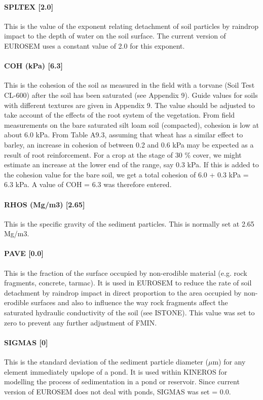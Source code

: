 \paragraph{SPLTEX [2.0]}
This is the value of the exponent relating detachment of soil particles by raindrop impact to the depth of water on the soil surface. The current version of EUROSEM uses a constant value of 2.0 for this exponent.
 
\paragraph{COH (kPa) [6.3]}
This is the cohesion of the soil as measured in the field with a torvane (Soil Test CL-600) after the soil has been saturated (see Appendix 9). Guide values for soils with different textures are given in Appendix 9. The value should be adjusted to take account of the effects of the root system of the vegetation.
From field measurements on the bare saturated silt loam soil (compacted), cohesion is low at about 6.0 kPa. From Table A9.3, assuming that wheat has a similar effect to barley, an increase in cohesion of between 0.2 and 0.6 kPa may be expected as a result of root reinforcement. For a crop at the stage of 30 \% cover, we might estimate an increase at the lower end of the range, say 0.3 kPa. If this is added to the cohesion value for the bare soil, we get a total cohesion of 6.0 + 0.3 kPa = 6.3 kPa. A value of COH = 6.3 was therefore entered.
 
\paragraph{RHOS (Mg/m3) [2.65]}
This is the specific gravity of the sediment particles. This is normally set at 2.65 Mg/m3.
 
\paragraph{PAVE [0.0]}
This is the fraction of the surface occupied by non-erodible material (e.g. rock fragments, concrete, tarmac). It is used in EUROSEM to reduce the rate of soil detachment by raindrop impact in direct proportion to the area occupied by non-erodible surfaces and also to influence the way rock fragments affect the saturated hydraulic conductivity of the soil (see ISTONE). This value was set to zero to prevent any further adjustment of FMIN.
 
\paragraph{SIGMAS [0]}
This is the standard deviation of the sediment particle diameter ($\mu$m) for any element immediately upslope of a pond. It is used within KINEROS for modelling the process of sedimentation in a pond or reservoir. Since current version of EUROSEM does not deal with ponds, SIGMAS was set = 0.0.
 
